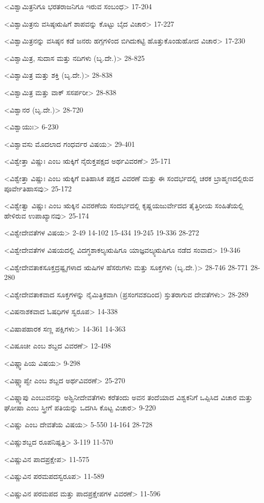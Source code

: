 <ವಿಶ್ವಾಮಿತ್ರನಿಗೂ ಭರತರಾಜನಿಗೂ ಇರುವ ಸಂಬಂಧ>
17-204


<ವಿಶ್ವಾಮಿತ್ರನು ವಸಿಷ್ಠಋಷಿಗೆ ಶಾಪವನ್ನು ಕೊಟ್ಟು ಬೈದ ವಿಚಾರ>
17-227

<ವಿಶ್ವಾಮಿತ್ರನನ್ನು ವಸಿಷ್ಠನ ಕಡೆ ಜನರು ಹಗ್ಗಗಳಿಂದ ಬಿಗಿದುಕಟ್ಟಿ ಹೊತ್ತುಕೊಂಡುಹೋದ ವಿಚಾರ>
17-230

<ವಿಶ್ವಾಮಿತ್ರ, ಸುದಾಸ ಮತ್ತು ನದಿಗಳು (ಬೃ.ದೇ.)>
28-825

<ವಿಶ್ವಾಮಿತ್ರ ಮತ್ತು ಶಕ್ತಿ (ಬೃ.ದೇ.)>
28-838

<ವಿಶ್ವಾಮಿತ್ರ ಮತ್ತು ವಾಕ್‍ ಸಸರ್ಪರೀ>
28-838

<ವಿಶ್ವಾನರ (ಬೃ.ದೇ.)>
28-720

<ವಿಶ್ವಾಯುಃ>
6-230

<ವಿಶ್ವಾವಸು ಮೊದಲಾದ ಗಂಧರ್ವರ ವಿಷಯ>
29-401

<ವಿಶ್ವೇತ್ತಾ ವಿಷ್ಣುಃ ಎಂಬ ಋಕ್ಕಿಗೆ ನೈರುಕ್ತಪಕ್ಷದ ಅರ್ಥವಿವರಣೆ>
25-171

<ವಿಶ್ವೇತ್ತಾ ವಿಷ್ಣುಃ ಎಂಬ ಋಕ್ಕಿಗೆ ಐತಿಹಾಸಿಕ ಪಕ್ಷದ ವಿವರಣೆ ಮತ್ತು ಈ ಸಂದರ್ಭದಲ್ಲಿ ಚರಕ ಬ್ರಾಹ್ಮಣದಲ್ಲಿರುವ ಪೂರ್ವೇತಿಹಾಸವು>
25-172

<ವಿಶ್ವೇತ್ವಾ ವಿಷ್ಣುಃ ಎಂಬ ಋಕ್ಕಿನ ವಿವರಣೆಯ ಸಂದರ್ಭದಲ್ಲಿ ಕೃಷ್ಣಯಜುರ್ವೇದದ ತೈತ್ತಿರೀಯ ಸಂಹಿತೆಯಲ್ಲಿ ಹೇಳಿರುವ ಉಪಾಖ್ಯಾನವು>
25-174

<ವಿಶ್ವೇದೇವತೆಗಳ ವಿಷಯ>
2-49
14-102
15-434 
19-245
19-336
28-272

<ವಿಶ್ವೇದೇವತೆಗಳ ವಿಷಯದಲ್ಲಿ ವಿದಗ್ಧಶಾಕಲ್ಯಋಷಿಗೂ ಯಾಜ್ಞವಲ್ಕ್ಯಋಷಿಗೂ ನಡೆದ ಸಂವಾದ>
19-346

<ವಿಶ್ವೇದೇವತಾಕಸೂಕ್ತದ್ರಷ್ಟೃಗಳಾದ ಋಷಿಗಳ ಹೆಸರುಗಳು ಮತ್ತು ಸೂಕ್ತಗಳು (ಬೃ.ದೇ.)>
28-746 
28-771
28-280

<ವಿಶ್ವೇದೇವತಾಕವಾದ ಸೂಕ್ತಗಳನ್ನು ನೈಮಿತ್ತಿಕವಾಗಿ (ಪ್ರಸಂಗವಶದಿಂದ) ಸ್ತುತರಾಗುವ ದೇವತೆಗಳು>
28-289

<ವಿಷನಾಶಕವಾದ ಓಷಧಿಗಳ ಸ್ವರೂಪ>
14-338

<ವಿಷಾಪಹಾರಕ ಸಣ್ಣ ಪಕ್ಷಿಗಳು>
14-361
14-363

<ವಿಷೂಚೀ ಎಂಬ ಶಬ್ದದ ವಿವರಣೆ>
12-498

<ವಿಷ್ಣ್ವಾಪಿಯ ವಿಷಯ>
9-298


<ವಿಷ್ಣ್ವಾಪ್ವೇ ಎಂಬ ಶಬ್ದದ ಅರ್ಥವಿವರಣೆ>
25-270

<ವಿಷ್ಣ್ವಾಪು ಎಂಬುವನನ್ನು ಅಶ್ವಿನೀದೇವತೆಗಳು ಕರೆತಂದು ಅವನ ತಂದೆಯಾದ ವಿಶ್ವಕನಿಗೆ ಒಪ್ಪಿಸಿದ ವಿಚಾರ ಮತ್ತು ಘೋಷಾ ಎಂಬ ಸ್ತ್ರೀಗೆ ಪತಿಯನ್ನು ಒದಗಿಸಿ ಕೊಟ್ಟ ವಿಚಾರ>
9-220

<ವಿಷ್ಣು ಎಂಬ ದೇವತೆಯ ವಿಷಯ>
5-550
14-164
28-728


<ವಿಷ್ಣುಶಬ್ದದ ರೂಪನಿಷ್ಪತ್ತಿ>
3-119
11-570

<ವಿಷ್ಣುವಿನ ಪಾದಪ್ರಕ್ಷೇಪ>
11-575

<ವಿಷ್ಣುವಿನ ಪರಮಪದಸ್ವರೂಪ>
11-589

<ವಿಷ್ಣುವಿನ ಪರಮಪದ ಮತ್ತು ಪಾದಪ್ರಕ್ಷೇಪಗಳ ವಿವರಣೆ>
11-596

